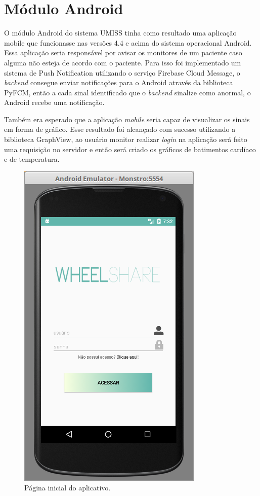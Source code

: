 \section{Módulo Android}

O módulo Android do sistema UMISS tinha como resultado uma aplicação mobile que 
funcionasse nas versões 4.4 e acima do sistema operacional Android. Essa aplicação
seria responsável por avisar os monitores de um paciente caso alguma não esteja de
acordo com o paciente. Para isso foi implementado um sistema de Push Notification
utilizando o serviço Firebase Cloud Message, o \textit{backend} consegue enviar 
notificações para o Android através da biblioteca PyFCM, então a cada sinal identificado
que o \textit{backend} sinalize como anormal, o Android recebe uma notificação.

Também era esperado que a aplicação \textit{mobile} seria capaz de visualizar
os sinais em forma de gráfico. Esse resultado foi alcançado com sucesso utilizando
a biblioteca GraphView, ao usuário monitor realizar \textit{login} na aplicação será
feito uma requisição no servidor e então será criado os gráficos de batimentos cardíaco
e de temperatura.

\begin{figure}[h!]
    \begin{center}
        \includegraphics[scale=0.5]{figuras/android2.png}
    \end{center}
    \caption{Página inicial do aplicativo.}
    \label{fig:android2}
\end{figure}

